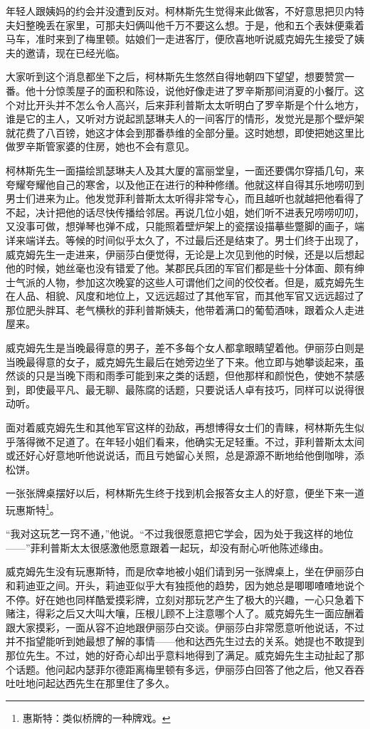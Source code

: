 \par 年轻人跟姨妈的约会并没遭到反对。柯林斯先生觉得来此做客，不好意思把贝内特夫妇整晚丢在家里，可那夫妇俩叫他千万不要这么想。于是，他和五个表妹便乘着马车，准时来到了梅里顿。姑娘们一走进客厅，便欣喜地听说威克姆先生接受了姨夫的邀请，现在已经光临。
\par 大家听到这个消息都坐下之后，柯林斯先生悠然自得地朝四下望望，想要赞赏一番。他十分惊羡屋子的面积和陈设，说他好像走进了罗辛斯那间消夏的小餐厅。这个对比开头并不怎么令人高兴，后来菲利普斯太太听明白了罗辛斯是个什么地方，谁是它的主人，又听对方说起凯瑟琳夫人的一间客厅的情形，发觉光是那个壁炉架就花费了八百镑，她这才体会到那番恭维的全部分量。这时她想，即使把她这里比做罗辛斯管家婆的住房，她也不会有意见。
\par 柯林斯先生一面描绘凯瑟琳夫人及其大厦的富丽堂皇，一面还要偶尔穿插几句，来夸耀夸耀他自己的寒舍，以及他正在进行的种种修缮。他就这样自得其乐地唠叨到男士们进来为止。他发觉菲利普斯太太听得非常专心，而且越听也就越把他看得了不起，决计把他的话尽快传播给邻居。再说几位小姐，她们听不进表兄唠唠叨叨，又没事可做，想弹琴也弹不成，只能照着壁炉架上的瓷摆设描摹些蹩脚的画子，端详来端详去。等候的时间似乎太久了，不过最后还是结束了。男士们终于出现了，威克姆先生一走进来，伊丽莎白便觉得，无论是上次见到他的时候，还是以后想起他的时候，她丝毫也没有错爱了他。某郡民兵团的军官们都是些十分体面、颇有绅士气派的人物，参加这次晚宴的这些人可谓他们之间的佼佼者。但是，威克姆先生在人品、相貌、风度和地位上，又远远超过了其他军官，而其他军官又远远超过了那位肥头胖耳、老气横秋的菲利普斯姨夫，他带着满口的葡萄酒味，跟着众人走进屋来。
\par 威克姆先生是当晚最得意的男子，差不多每个女人都拿眼睛望着他。伊丽莎白则是当晚最得意的女子，威克姆先生最后在她旁边坐了下来。他立即与她攀谈起来，虽然谈的只是当晚下雨和雨季可能到来之类的话题，但他那样和颜悦色，使她不禁感到，即使最平凡、最无聊、最陈腐的话题，只要说话人卓有技巧，同样可以说得很动听。
\par 面对着威克姆先生和其他军官这样的劲敌，再想博得女士们的青睐，柯林斯先生似乎落得微不足道了。在年轻小姐们看来，他确实无足轻重。不过，菲利普斯太太间或还好心好意地听他说说话，而且亏她留心关照，总是源源不断地给他倒咖啡，添松饼。
\par 一张张牌桌摆好以后，柯林斯先生终于找到机会报答女主人的好意，便坐下来一道玩惠斯特\footnote{惠斯特：类似桥牌的一种牌戏。}。
\par “我对这玩艺一窍不通，”他说。“不过我很愿意把它学会，因为处于我这样的地位——”菲利普斯太太很感激他愿意跟着一起玩，却没有耐心听他陈述缘由。
\par 威克姆先生没有玩惠斯特，而是欣幸地被小姐们请到另一张牌桌上，坐在伊丽莎白和莉迪亚之间。开头，莉迪亚似乎大有独揽他的趋势，因为她总是唧唧喳喳地说个不停。好在她也同样酷爱摸彩牌，立刻对那玩艺产生了极大的兴趣，一心只急着下赌注，得彩之后又大叫大嚷，压根儿顾不上注意哪个人了。威克姆先生一面应酬着跟大家摸彩，一面从容不迫地跟伊丽莎白交谈。伊丽莎白非常愿意听他说话，不过并不指望能听到她最想了解的事情——他和达西先生过去的关系。她提也不敢提到那位先生。不过，她的好奇心却出乎意料地得到了满足。威克姆先生主动扯起了那个话题。他问起内瑟菲尔德距离梅里顿有多远，伊丽莎白回答了他之后，他又吞吞吐吐地问起达西先生在那里住了多久。
